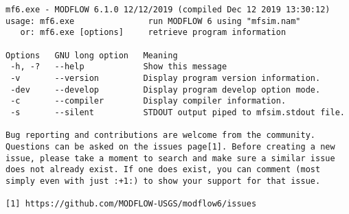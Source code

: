 {\small
\begin{lstlisting}[style=modeloutput]
mf6.exe - MODFLOW 6.1.0 12/12/2019 (compiled Dec 12 2019 13:30:12)
usage: mf6.exe               run MODFLOW 6 using "mfsim.nam"
   or: mf6.exe [options]     retrieve program information

Options   GNU long option   Meaning
 -h, -?   --help            Show this message
 -v       --version         Display program version information.
 -dev     --develop         Display program develop option mode.
 -c       --compiler        Display compiler information.
 -s       --silent          STDOUT output piped to mfsim.stdout file.

Bug reporting and contributions are welcome from the community.
Questions can be asked on the issues page[1]. Before creating a new
issue, please take a moment to search and make sure a similar issue
does not already exist. If one does exist, you can comment (most
simply even with just :+1:) to show your support for that issue.

[1] https://github.com/MODFLOW-USGS/modflow6/issues


\end{lstlisting}
}
